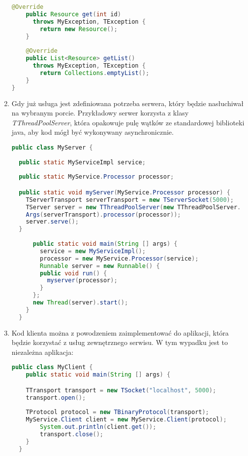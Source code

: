 \begin{enumerate}
\begin{lstlisting}[language=java, caption=Implementacja kodu usługi]
    @Override
    public Resource get(int id) 
      throws MyException, TException {
        return new Resource();
    }
    
    @Override
    public List<Resource> getList() 
      throws MyException, TException {
        return Collections.emptyList();
    }
}
  \end{lstlisting}
  \item Gdy już usługa jest zdefiniowana potrzeba serwera, który będzie nasłuchiwał na wybranym porcie. Przykładowy serwer korzysta z klasy \textit{TThreadPoolServer}, która opakowuje pulę wątków ze standardowej biblioteki java, aby kod mógł być wykonywany asynchronicznie.
        \begin{lstlisting}[language=java, caption=Kod serwera]
public class MyServer {
  
  public static MyServiceImpl service;
  
  public static MyService.Processor processor;

  public static void myServer(MyService.Processor processor) {
    TServerTransport serverTransport = new TServerSocket(5000);
    TServer server = new TThreadPoolServer(new TThreadPoolServer.
    Args(serverTransport).processor(processor));
    server.serve();
  }
  
      public static void main(String [] args) {
        service = new MyServiceImpl();
        processor = new MyService.Processor(service);
        Runnable server = new Runnable() {
        public void run() {
          myserver(processor);
        }
      };
      new Thread(server).start();
    }
  }
  \end{lstlisting}
  \item Kod klienta można z powodzeniem zaimplementować do aplikacji, która będzie korzystać z usług zewnętrznego serwisu. W tym wypadku jest to niezależna aplikacja:
        \begin{lstlisting}[language=java, caption=Kod klienta]
  public class MyClient {
    public static void main(String [] args) {

    TTransport transport = new TSocket("localhost", 5000);
    transport.open();
    
    TProtocol protocol = new TBinaryProtocol(transport);
    MyService.Client client = new MyService.Client(protocol);
        System.out.println(client.get());
        transport.close();
    }
  }
  \end{lstlisting}
\end{enumerate}
